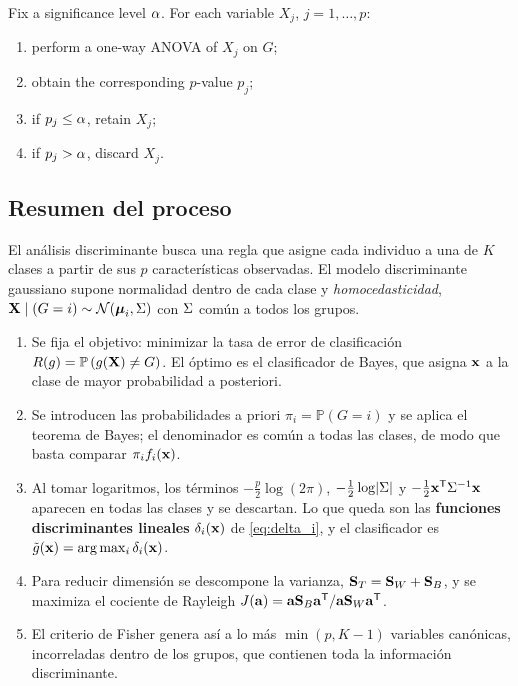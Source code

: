 Fix a significance level $\alpha$. For each variable $X_j$, $j=1,\dots,p$:
\begin{enumerate}
  \item perform a one-way ANOVA of $X_j$ on $G$;
  \item obtain the corresponding $p$-value $p_j$;
  \item if $p_j\le\alpha$, retain $X_j$;
  \item if $p_j>\alpha$, discard $X_j$.
\end{enumerate}

\subsection{Resumen del proceso}
\label{subsec:resumen_discriminante}

El an\'alisis discriminante busca una regla que asigne cada individuo a una de
$K$ clases a partir de sus $p$ caracter\'isticas observadas. El modelo
discriminante gaussiano supone normalidad dentro de cada clase y
\emph{homocedasticidad}, $\mathbf{X}\mid(G=i)\sim\mathcal{N}(\boldsymbol{\mu}_i,\Sigma)$ con $\Sigma$
com\'un a todos los grupos.

\begin{enumerate}
  \item Se fija el objetivo: minimizar la tasa de error de clasificaci\'on
        $R(g)=\mathbb{P}\left( g(\mathbf{X})\neq G \right)$. El \'optimo es el clasificador
        de Bayes, que asigna $\mathbf{x}$ a la clase de mayor probabilidad a
        posteriori.
  \item Se introducen las probabilidades a priori $\pi_i=\mathbb{P}(G=i)$ y se
        aplica el teorema de Bayes; el denominador es com\'un a todas las
        clases, de modo que basta comparar $\pi_i f_i(\mathbf{x})$.
  \item Al tomar logaritmos, los t\'erminos
        $-\tfrac{p}{2}\log(2\pi)$, $-\tfrac12\log\lvert \Sigma \rvert$ y
        $-\tfrac12\mathbf{x}^{\mathsf{T}}\Sigma^{-1}\mathbf{x}$ aparecen en todas las clases y se
        descartan. Lo que queda son las \textbf{funciones discriminantes
        lineales} $\delta_i(\mathbf{x})$ de \eqref{eq:delta_i}, y el clasificador es
        $\tilde{g}(\mathbf{x})=\arg\max_i\delta_i(\mathbf{x})$.
  \item Para reducir dimensi\'on se descompone la varianza,
        $\mathbf{S}_T=\mathbf{S}_W+\mathbf{S}_B$, y se maximiza el cociente de Rayleigh
        $J(\mathbf{a})=\mathbf{a}\mathbf{S}_B\mathbf{a}^{\mathsf{T}}/\mathbf{a}\mathbf{S}_W\mathbf{a}^{\mathsf{T}}$.
  \item El criterio de Fisher genera as\'i a lo m\'as $\min(p,K-1)$ variables
        can\'onicas, incorreladas dentro de los grupos, que contienen toda la
        informaci\'on discriminante.
\end{enumerate}

